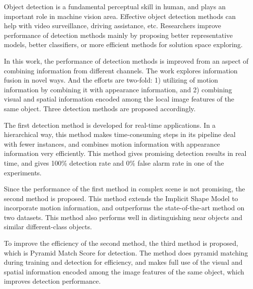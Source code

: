 \begin{eabstract}


Object detection is a fundamental perceptual skill in human, and plays an important role in machine vision area. Effective object detection methods can help with video surveillance, driving assistance, etc. Researchers improve performance of detection methods mainly by proposing better representative models, better classifiers, or more efficient methods for  solution space exploring.

In this work, the performance of detection methods is improved from an aspect of combining information from different channels. The work explores information fusion in novel ways. And the efforts are two-fold: 1) utilizing of motion information by combining it with appearance information, and 2) combining visual and spatial information encoded among the local image features of the same object. Three detection methods are proposed accordingly.

The first detection method is developed for real-time applications. In a hierarchical way, this method makes time-consuming steps in its pipeline deal with fewer instances, and combines motion information with appearance information very efficiently. This method gives promising detection results in real time, and gives 100\% detection rate and 0\% false alarm rate in one of the experiments.

Since the performance of the first method in complex scene is not promising, the second method is proposed. This method extends the Implicit Shape Model to incorporate motion information, and outperforms the state-of-the-art method on two datasets. This method also performs well in distinguishing near objects and similar different-class objects.

To improve the efficiency of the second method, the third method is proposed, which is Pyramid Match Score for detection. The method does pyramid matching during training and detection for efficiency, and makes full use of the visual and spatial  information encoded among the image features of the same object, which improves detection performance.
\end{eabstract}



